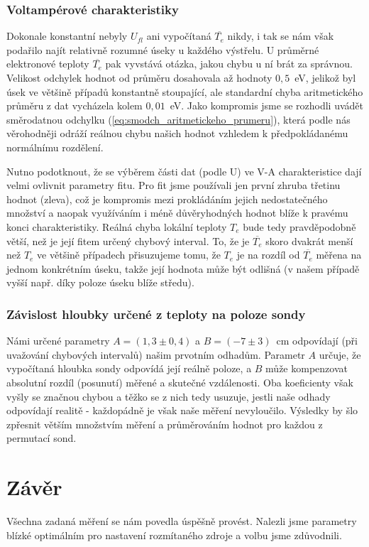 \documentclass[english]{article}
\begin{document}
			\subsubsection{Voltampérové charakteristiky }
					Dokonale konstantní nebyly $U_{fl}$ ani vypočítaná $\overline{T_e}$ nikdy, i tak se nám však podařilo najít relativně rozumné úseky u každého výstřelu. U průměrné elektronové teploty $\overline{T_e}$ pak vyvstává otázka, jakou chybu u ní brát za správnou. Velikost odchylek hodnot od průměru dosahovala až hodnoty $0,5$~eV, jelikož byl úsek ve většině případů konstantně stoupající, ale standardní chyba aritmetického průměru z dat vycházela kolem $0,01$~eV. Jako kompromis jsme se rozhodli uvádět směrodatnou odchylku (\ref{eq:smodch_aritmetickeho_prumeru}), která podle nás věrohodněji odráží reálnou chybu našich hodnot vzhledem k předpokládanému normálnímu rozdělení.
					
					Nutno podotknout, že se výběrem části dat (podle U) ve V-A charakteristice dají velmi ovlivnit parametry fitu. Pro fit jsme používali jen první zhruba třetinu hodnot (zleva), což je kompromis mezi prokládáním jejich nedostatečného množství a naopak využíváním i méně důvěryhodných hodnot blíže k pravému konci charakteristiky. Reálná chyba lokální teploty $T_e$ bude tedy pravděpodobně větší, než je její fitem určený chybový interval. To, že je $\overline{T_e}$ skoro dvakrát menší než $T_e$ ve většině případech přisuzujeme tomu, že $T_e$ je na rozdíl od $\overline{T_e}$ měřena na jednom konkrétním úseku, takže její hodnota může být odlišná (v našem případě vyšší např. díky poloze úseku blíže středu).
			
			\subsubsection{Závislost hloubky určené z teploty na poloze sondy}
					Námi určené parametry  $A=(1,3\pm0,4)$ a $B=(-7\pm3)$~cm odpovídají (při uvažování chybových intervalů) našim prvotním odhadům. Parametr $A$ určuje, že vypočítaná hloubka sondy odpovídá její reálně poloze, a $B$ může kompenzovat absolutní rozdíl (posunutí) měřené a skutečné vzdálenosti. Oba koeficienty však vyšly se značnou chybou a těžko se z nich tedy usuzuje, jestli naše odhady odpovídají realitě - každopádně je však naše měření nevyloučilo. Výsledky by šlo zpřesnit větším množstvím měření a průměrováním hodnot pro každou z permutací sond. 
						
\section{Závěr}
		Všechna zadaná měření se nám povedla úspěšně provést. Nalezli jsme parametry blízké optimálním pro nastavení rozmítaného zdroje a volbu jsme zdůvodnili.
		
\end{document}
